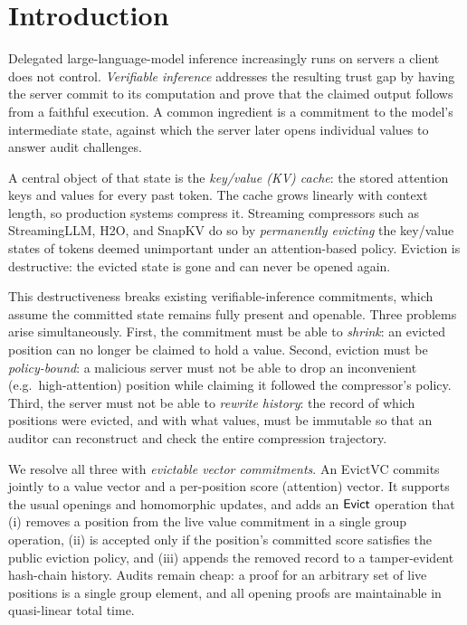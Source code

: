 \section{Introduction}\label{sec:intro}

Delegated large-language-model inference increasingly runs on servers a client
does not control. \emph{Verifiable inference} addresses the resulting trust gap
by having the server commit to its computation and prove that the claimed output
follows from a faithful execution. A common ingredient is a commitment to the
model's intermediate state, against which the server later opens individual
values to answer audit challenges.

A central object of that state is the \emph{key/value (KV) cache}: the stored
attention keys and values for every past token. The cache grows linearly with
context length, so production systems compress it. Streaming compressors such as
StreamingLLM, H2O, and SnapKV do so by \emph{permanently evicting} the
key/value states of tokens deemed unimportant under an attention-based policy.
Eviction is destructive: the evicted state is gone and can never be opened
again.

This destructiveness breaks existing verifiable-inference commitments, which
assume the committed state remains fully present and openable. Three problems
arise simultaneously. First, the commitment must be able to \emph{shrink}: an
evicted position can no longer be claimed to hold a value. Second, eviction must
be \emph{policy-bound}: a malicious server must not be able to drop an
inconvenient (e.g.\ high-attention) position while claiming it followed the
compressor's policy. Third, the server must not be able to \emph{rewrite history}:
the record of which positions were evicted, and with what values, must be
immutable so that an auditor can reconstruct and check the entire compression
trajectory.

We resolve all three with \emph{evictable vector commitments}. An EvictVC commits
jointly to a value vector and a per-position score (attention) vector. It
supports the usual openings and homomorphic updates, and adds an $\mathsf{Evict}$
operation that (i) removes a position from the live value commitment in a single
group operation, (ii) is accepted only if the position's committed score
satisfies the public eviction policy, and (iii) appends the removed record to a
tamper-evident hash-chain history. Audits remain cheap: a proof for an arbitrary
set of live positions is a single group element, and all opening proofs are
maintainable in quasi-linear total time.

